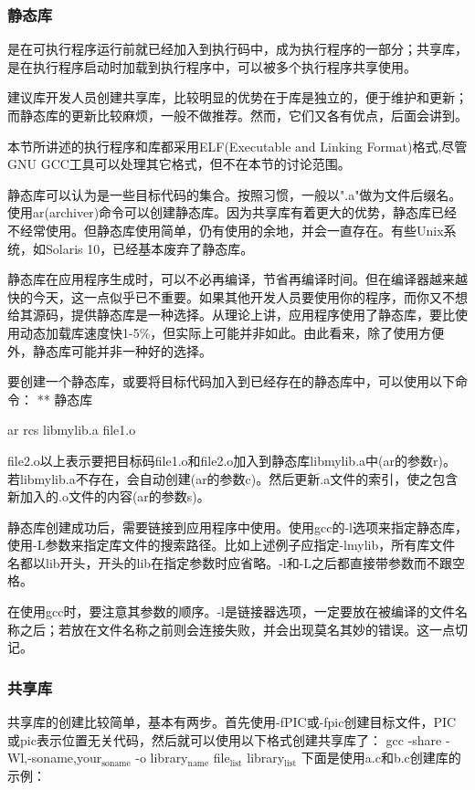 \documentclass[11pt]{article}
\begin{document}
\subsubsection{静态库}
\label{sec-1-5-1}

是在可执行程序运行前就已经加入到执行码中，成为执行程序的一部分；共享库，是在执行程序启动时加载到执行程序中，可以被多个执行程序共享使用。 

建议库开发人员创建共享库，比较明显的优势在于库是独立的，便于维护和更新；而静态库的更新比较麻烦，一般不做推荐。然而，它们又各有优点，后面会讲到。 

本节所讲述的执行程序和库都采用ELF(Executable and Linking Format)格式,尽管GNU GCC工具可以处理其它格式，但不在本节的讨论范围。 

静态库可以认为是一些目标代码的集合。按照习惯，一般以".a"做为文件后缀名。使用ar(archiver)命令可以创建静态库。因为共享库有着更大的优势，静态库已经不经常使用。但静态库使用简单，仍有使用的余地，并会一直存在。有些Unix系统，如Solaris 10，已经基本废弃了静态库。 

静态库在应用程序生成时，可以不必再编译，节省再编译时间。但在编译器越来越快的今天，这一点似乎已不重要。如果其他开发人员要使用你的程序，而你又不想给其源码，提供静态库是一种选择。从理论上讲，应用程序使用了静态库，要比使用动态加载库速度快1-5\%，但实际上可能并非如此。由此看来，除了使用方便外，静态库可能并非一种好的选择。 

要创建一个静态库，或要将目标代码加入到已经存在的静态库中，可以使用以下命令： ** 静态库

ar rcs libmylib.a file1.o

file2.o以上表示要把目标码file1.o和file2.o加入到静态库libmylib.a中(ar的参数r)。若libmylib.a不存在，会自动创建(ar的参数c)。然后更新.a文件的索引，使之包含新加入的.o文件的内容(ar的参数s)。 


静态库创建成功后，需要链接到应用程序中使用。使用gcc的-l选项来指定静态库，使用-L参数来指定库文件的搜索路径。比如上述例子应指定-lmylib，所有库文件名都以lib开头，开头的lib在指定参数时应省略。-l和-L之后都直接带参数而不跟空格。 

在使用gcc时，要注意其参数的顺序。-l是链接器选项，一定要放在被编译的文件名称之后；若放在文件名称之前则会连接失败，并会出现莫名其妙的错误。这一点切记。
\subsubsection{共享库}
\label{sec-1-5-2}

共享库的创建比较简单，基本有两步。首先使用-fPIC或-fpic创建目标文件，PIC或pic表示位置无关代码，然后就可以使用以下格式创建共享库了： gcc -share -Wl,-soname,your$_{\text{soname}}$ -o library$_{\text{name}}$ file$_{\text{list}}$ library$_{\text{list}}$ 下面是使用a.c和b.c创建库的示例： 
\end{document}
